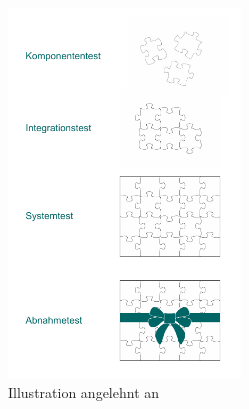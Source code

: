 \begin{figure}[h!]
	\centering
	\includegraphics[width=0.55\textwidth]{Bilder/Kapitel-11/Puzzle_Testen.pdf}
	\caption[Illustration Teststrategien]{Illustration angelehnt an \cite{gli05}}
	\label{fig:puzzle_testen}
\end{figure}